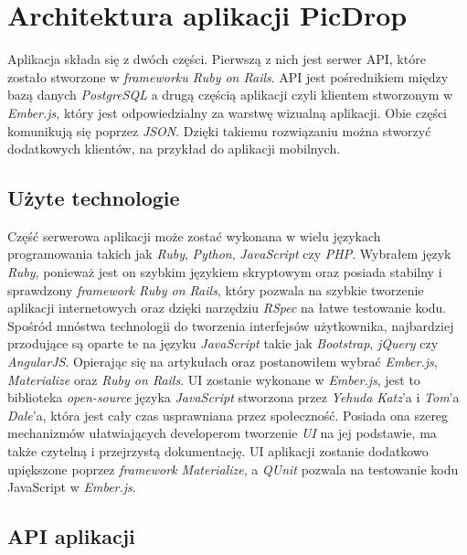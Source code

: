 \documentclass[openright]{xmgr}
\begin{document}
\chapter{Architektura aplikacji PicDrop}
Aplikacja składa się z dwóch części. Pierwszą z nich jest serwer API, które zostało stworzone w \textit{frameworku Ruby on Rails}. API jest pośrednikiem między bazą danych \textit{PostgreSQL} a drugą częścią aplikacji czyli klientem stworzonym w \textit{Ember.js}, który jest odpowiedzialny za warstwę wizualną aplikacji. Obie części komunikują się poprzez \textit{JSON}. Dzięki takiemu rozwiązaniu można stworzyć dodatkowych klientów, na przykład do aplikacji mobilnych.

\section{Użyte technologie}
Część serwerowa aplikacji może zostać wykonana w wielu językach programowania takich jak \textit{Ruby}, \textit{Python}, \textit{JavaScript} czy \textit{PHP}.
Wybrałem język \textit{Ruby}, ponieważ jest on szybkim językiem skryptowym oraz posiada stabilny i sprawdzony \textit{framework} \textit{Ruby on Rails}, który pozwala na szybkie tworzenie aplikacji internetowych oraz dzięki narzędziu \textit{RSpec} na łatwe testowanie kodu.
Spośród mnóstwa technologii do tworzenia interfejsów użytkownika, najbardziej przodujące są oparte te na języku \textit{JavaScript} takie jak \textit{Bootstrap},\textit{ jQuery} czy\\ \textit{AngularJS}. Opierając się na artykułach \cite{} oraz \cite{} postanowiłem wybrać \textit{Ember.js}, \textit{Materialize} oraz \textit{Ruby on Rails}. UI zostanie wykonane w \textit{Ember.js}, jest to  biblioteka  \textit{open-source} języka \textit{JavaScript} stworzona  przez  \textit{Yehuda Katz}'a i \textit{Tom}'a \textit{Dale}'a, która jest cały czas usprawniana przez społeczność. Posiada ona szereg mechanizmów ułatwiających developerom tworzenie \textit{UI} na jej podstawie, ma także czytelną i przejrzystą dokumentację. UI aplikacji zostanie dodatkowo upiększone poprzez \textit{framework Materialize}, a \textit{QUnit} pozwala na testowanie kodu JavaScript w \textit{Ember.js}.

\section{API aplikacji}
\end{document}
